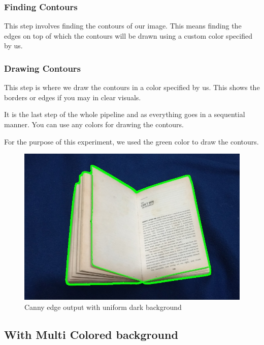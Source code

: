 \documentclass[BTech]{srmuthesis}
\begin{document}
\subsubsection{Finding Contours}

This step involves finding the contours of our image. This means finding the edges on top of which the contours will be drawn using a custom color specified by us.

\subsubsection{Drawing Contours}

This step is where we draw the contours in a  color specified by us. This shows the borders or edges if you may in clear visuals.

It is the last step of the whole pipeline and as everything goes in a sequential manner. You can use any colors for drawing the contours.

For the purpose of this experiment, we used the green color to draw the contours.

\begin{figure}[h!]
    \centering
    \includegraphics[width=15cm\textwidth]{canny-edge-out1}
    \caption{Canny edge output with uniform dark background}
    \label{fig:Canny edge output with uniform background}
\end{figure}

\newpage

\subsection{With Multi Colored background}
\end{document}
